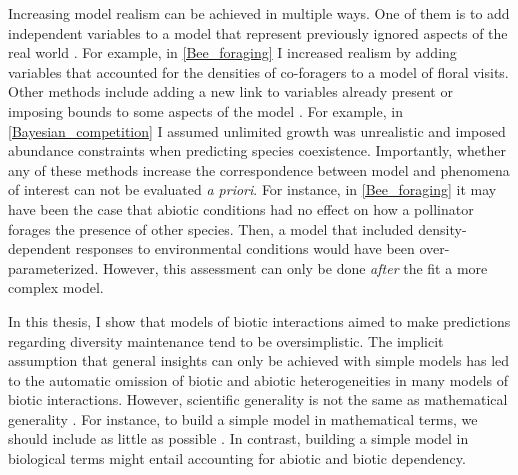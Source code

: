 \begin{refsection}
Increasing model realism can be achieved in multiple ways. One of them is to add independent variables to a model that represent previously ignored aspects of the real world \citep{orzack1993critical, evans2013simple}. For example, in \autoref{Bee_foraging} I increased realism by adding variables that accounted for the densities of co-foragers to a model of floral visits. Other methods include adding a new link to variables already present or imposing bounds to some aspects of the model \citep{levins1993response}. For example, in \autoref{Bayesian_competition} I assumed unlimited growth was unrealistic and imposed abundance constraints when predicting species coexistence. Importantly, whether any of these methods increase the correspondence between model and phenomena of interest can not be evaluated \textit{a priori}. For instance, in  \autoref{Bee_foraging} it may have been the case that abiotic conditions had no effect on how a pollinator forages the presence of other species. Then, a model that included density-dependent responses to environmental conditions would have been over-parameterized. However, this assessment can only be done \textit{after} the fit a more complex model.


In this thesis, I show that models of biotic interactions aimed to make predictions regarding diversity maintenance tend to be oversimplistic. The implicit assumption that general insights can only be achieved with simple models \citep{holling1966strategy,may2019stability,roughgarden2018adaptive} has led to the automatic omission of biotic and abiotic heterogeneities in many models of biotic interactions. However, scientific generality is not the same as mathematical generality \citep{levins1993response}.  For instance, to build a simple model in mathematical terms, we should include as little as possible \citep{orzack2012philosophy}. In contrast, building a simple model in biological terms might entail accounting for abiotic and biotic dependency.


\end{refsection}
